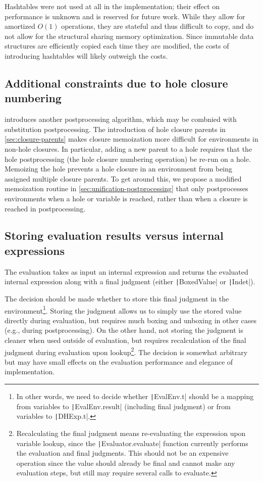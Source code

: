 Hashtables were not used at all in the implementation; their effect on performance is unknown and is reserved for future work. While they allow for amortized $O(1)$ operations, they are stateful and thus difficult to copy, and do not allow for the structural sharing memory optimization. Since immutable data structures are efficiently copied each time they are modified, the costs of introducing hashtables will likely outweigh the costs.

\subsection{Additional constraints due to hole closure numbering}
\label{sec:difficulties-hole-numbering}

 introduces another postprocessing algorithm, which may be combnied with substitution postprocessing. The introduction of hole closure parents in \cref{sec:closure-parents} makes closure memoization more difficult for environments in non-hole closures. In particular, adding a new parent to a hole requires that the hole postprocessing (the hole closure numbering operation) be re-run on a hole. Memoizing the hole prevents a hole closure in an environment from being assigned multiple closure parents. To get around this, we propose a modified memoization routine in \cref{sec:unification-postprocessing} that only postprocesses environments when a hole or variable is reached, rather than when a closure is reached in postprocessing.

\subsection{Storing evaluation results versus internal expressions}
\label{sec:result-vs-dhexp}

The evaluation takes as input an internal expression and returns the evaluated internal expression along with a \textsf{final} judgment (either \texttt|BoxedValue| or \texttt|Indet|).

The decision should be made whether to store this \textsf{final} judgment in the environment\footnote{In other words, we need to decide whether \texttt|EvalEnv.t| should be a mapping from variables to \texttt|EvalEnv.result| (including \textsf{final} judgment) or from variables to \texttt|DHExp.t|.}. Storing the judgment allows us to simply use the stored value directly during evaluation, but requires much boxing and unboxing in other cases (e.g., during postprocessing). On the other hand, not storing the judgment is cleaner when used outside of evaluation, but requires recalculation of the \textsf{final} judgment during evaluation upon lookup\footnote{Recalculating the \textsf{final} judgment means re-evaluating the expression upon variable lookup, since the \texttt|Evaluator.evaluate| function currently performs the evaluation and \textsf{final} judgments. This should not be an expensive operation since the value should already be final and cannot make any evaluation steps, but still may require several calls to evaluate.}. The decision is somewhat arbitrary but may have small effects on the evaluation performance and elegance of implementation.

